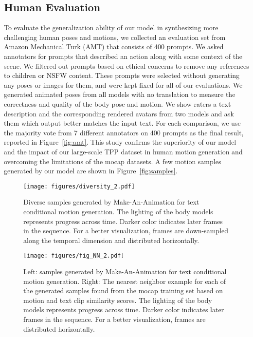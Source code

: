 \documentclass[10pt,twocolumn,letterpaper]{article}
\begin{document}
\subsection{Human Evaluation}
To evaluate the generalization ability of our model in synthesizing more challenging human poses and motions, we collected an evaluation set from Amazon Mechanical Turk (AMT) that consists of 400 prompts. We asked annotators for prompts that described an action along with some context of the scene. We filtered out prompts based on ethical concerns to remove any references to children or NSFW content. These prompts were selected without generating any poses or images for them, and were kept fixed for all of our evaluations. We generated animated poses from all models with no translation to measure the correctness and quality of the body pose and motion. 
We show raters a text description and the corresponding rendered
avatars from two models and ask them which output better matches
the input text. For each comparison, we use the majority vote from
7 different annotators on 400 prompts as the final result, reported in Figure~\ref{fig:amt}. This study confirms the superiority of our model and the impact of our large-scale TPP dataset in human motion generation and overcoming the limitations of the mocap datasets. A few motion samples generated by our model are shown in Figure~\ref{fig:samples}.



\begin{figure}
  \centering \texttt{[image: figures/diversity\_2.pdf]}
  \caption{Diverse samples generated by Make-An-Animation for text conditional motion generation. The lighting of the body models represents progress across time. Darker color indicates later frames in the sequence. For a better visualization, frames are down-sampled along the temporal dimension and distributed horizontally. }
  \label{fig:diversity}
\end{figure}


\begin{figure*}
  \centering \texttt{[image: figures/fig\_NN\_2.pdf]}
  \caption{Left: samples generated by Make-An-Animation for text conditional motion generation. Right: The nearest neighbor example for each of the generated samples found from the mocap training set based on motion and text clip similarity scores. The lighting of the body models represents progress across time. Darker color indicates later frames in the sequence. For a better visualization, frames are distributed horizontally. } 
  \label{fig:fig_nn}
\end{figure*}
\end{document}

